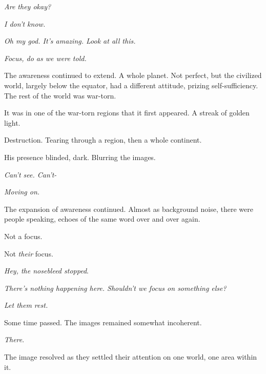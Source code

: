 \emph{Are they okay?}



\emph{I don't know.}



\emph{Oh my god.  It's amazing.  Look at all this.}



\emph{Focus, do as we were told.}



The awareness continued to extend.  A whole planet.  Not perfect, but the civilized world, largely below the equator, had a different attitude, prizing self-sufficiency.  The rest of the world was war-torn.



It was in one of the war-torn regions that it first appeared.  A streak of golden light.



Destruction.  Tearing through a region, then a whole continent.



His presence blinded, dark.  Blurring the images.



\emph{Can't see.  Can't-}



\emph{Moving on.}



\sectionbreak



The expansion of awareness continued.  Almost as background noise, there were people speaking, echoes of the same word over and over again.



Not a focus.



Not \emph{their} focus.



\emph{Hey, the nosebleed stopped}.



\emph{There's nothing happening here.  Shouldn't we focus on something else?}



\emph{Let them rest.}



Some time passed.  The images remained somewhat incoherent.



\emph{There}.



The image resolved as they settled their attention on one world, one area within it.



